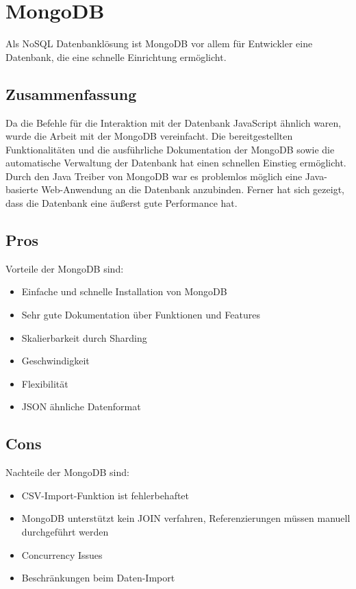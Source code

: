 \section{MongoDB}
Als NoSQL Datenbankl\"osung ist MongoDB vor allem f\"ur Entwickler eine Datenbank, die eine schnelle Einrichtung erm\"oglicht.\\

\subsection{Zusammenfassung}
Da die Befehle f\"ur die Interaktion mit der Datenbank JavaScript \"ahnlich waren, wurde die Arbeit mit der MongoDB vereinfacht. Die bereitgestellten Funktionalit\"aten und die ausf\"uhrliche Dokumentation der MongoDB sowie die automatische Verwaltung der Datenbank hat einen schnellen Einstieg erm\"oglicht. Durch den Java Treiber von MongoDB war es problemlos m\"oglich eine Java-basierte Web-Anwendung an die Datenbank anzubinden. Ferner hat sich gezeigt, dass die Datenbank eine \"au\ss{}erst gute Performance hat.\\ 

\subsection{Pros}
Vorteile der MongoDB sind:\\
\begin{itemize}
\item Einfache und schnelle Installation von MongoDB
\item Sehr gute Dokumentation \"uber Funktionen und Features
\item Skalierbarkeit durch Sharding
\item Geschwindigkeit
\item Flexibilit\"at
\item JSON \"ahnliche Datenformat
\end{itemize}

\subsection{Cons}
Nachteile der MongoDB sind:\\
\begin{itemize}
\item CSV-Import-Funktion ist fehlerbehaftet
\item MongoDB unterst\"utzt kein JOIN verfahren, Referenzierungen m\"ussen manuell durchgef\"uhrt werden
\item Concurrency Issues
\item Beschr\"ankungen beim Daten-Import
\end{itemize}

